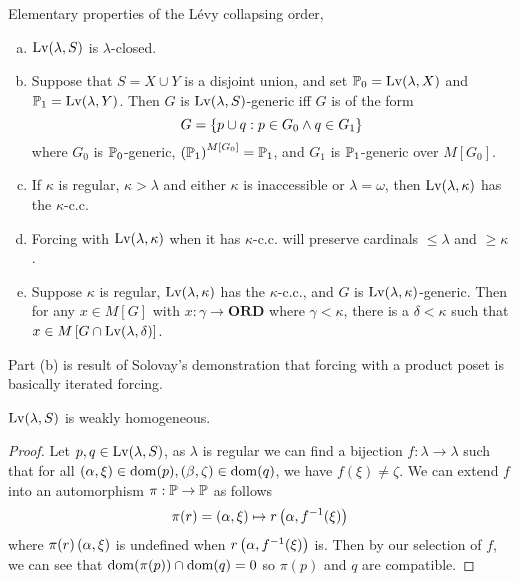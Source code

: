 \begin{lemma}
    Elementary properties of the Lévy collapsing order,
    \begin{enumerate}[(a)]
        \item \(\Lv(\lambda,S)\) is \(\lambda\)-closed.
        \item Suppose that \(S = X\cup Y\) is a disjoint union,
            and set \(\P_0 = \Lv(\lambda,X)\) and \(\P_1 = \Lv(\lambda,Y)\).
            Then \(G\) is \(\Lv(\lambda,S)\)-generic iff \(G\) is of the form
            \[G = \set{p\cup q: p\in G_0\land q\in G_1 }\]
            where \(G_0\) is \(\P_0\)-generic, \(\paren{\P_1}^{M[G_0]} = \P_1\),
            and \(G_1\) is \(\P_1\)-generic over \(M[G_0]\).
        \item If \(\kappa\) is regular, \(\kappa > \lambda\) and either \(\kappa\) is inaccessible or \(\lambda = \omega\),
            then \(\Lv(\lambda,\kappa)\) has the \(\kappa\)-c.c.
        \item Forcing with \(\Lv(\lambda,\kappa)\) when it has \(\kappa\)-c.c. will preserve cardinals \(\leq \lambda\) and \(\geq \kappa\).
        \item Suppose \(\kappa\) is regular, \(\Lv(\lambda,\kappa)\) has the \(\kappa\)-c.c., and
            \(G\) is \(\Lv(\lambda,\kappa)\)-generic.
            Then for any \(x\in M[G]\) with \(x:\gamma \to \mathbf{ORD}\) where \(\gamma < \kappa\),
            there is a \(\delta<\kappa\) such that \(x\in M\sq{G\cap\Lv(\lambda,\delta)}\).
    \end{enumerate}
\end{lemma}

Part (b) is result of Solovay's demonstration that forcing with a product poset is basically iterated forcing.

\begin{proposition}
    \(\Lv(\lambda,S)\) is weakly homogeneous.
\end{proposition}
\begin{proof}
    Let \(p,q\in\Lv(\lambda,S)\), as \(\lambda\) is regular we can find a bijection \(f:\lambda\to\lambda\) such that
    for all \((\alpha,\xi)\in\dom(p), (\beta,\zeta)\in\dom(q)\), we have \(f(\xi) \ne \zeta\).
    We can extend \(f\) into an automorphism \(\pi:\P\to\P\) as follows
    \[ \pi(r) = \paren{\alpha,\xi}\mapsto r\paren{\alpha, f^{-1}(\xi)} \]
    where \(\pi(r)\paren{\alpha,\xi}\) is undefined when \(r\paren{\alpha,f^{-1}(\xi)}\) is.
    Then by our selection of \(f\), we can see that \(\dom(\pi(p)) \cap\dom(q) = 0\) so \(\pi(p)\) and \(q\) are compatible.
\end{proof}

